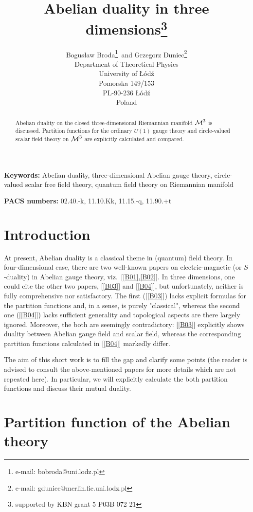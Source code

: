 \documentclass[a4paper,12pt]{article}
\title{Abelian duality in three dimensions\footnote{%
supported by KBN grant 5 P03B 072 21}}
\author{Bogus\l aw Broda\footnote{e-mail: bobroda@uni.lodz.pl}\, and    Grzegorz Duniec\footnote{e-mail: gduniec@merlin.fic.uni.lodz.pl}\\
Department of Theoretical Physics\\
                         University of \L \'od\'z\\
                           Pomorska 149/153\\
                          PL-90-236 \L \'od\'z\\
                                       Poland}
\begin{document}
\baselineskip24pt
\maketitle

\begin{abstract}
Abelian duality on the closed three-dimensional Riemannian manifold
${\cal M}^3$ is discussed. Partition functions for the ordinary $U(1)$ gauge theory and circle-valued scalar field theory on ${\cal M}^3$ are
explicitly calculated and compared.
\end{abstract}

\noindent
{\bf Keywords:} Abelian duality, three-dimensional Abelian gauge theory, circle-valued scalar free field theory, quantum field theory on Riemannian manifold

\noindent
{\bf PACS numbers:} 02.40.-k, 11.10.Kk, 11.15.-q, 11.90.+t

\section{Introduction}

At present, Abelian duality is a classical theme in (quantum)
field theory. In four-dimensional case, there are two well-known
papers on electric-magnetic (or $S$-duality) in Abelian gauge
theory, viz.\ [\ref{B01},\ref{B02}]. In three dimensions, one could
cite the other two papers, [\ref{B03}] and [\ref{B04}], but
unfortunately, neither is fully comprehensive nor satisfactory.
The first ([\ref{B03}]) lacks explicit formulas for the partition
functions and, in a sense, is purely "classical", whereas the
second one ([\ref{B04}]) lacks sufficient generality and
topological aspects are there largely ignored. Moreover, the both
are seemingly contradictory: [\ref{B03}] explicitly shows duality
between Abelian gauge field and scalar field, whereas the
corresponding partition functions calculated in [\ref{B04}]
markedly differ.

The aim of this short work is to fill the gap and
clarify some points (the reader is advised to consult the above-mentioned papers for more
details which are not repeated here).
In particular, we will explicitly calculate the both partition functions and discuss their mutual duality.

\section{Partition function of the Abelian theory}
\end{document}

